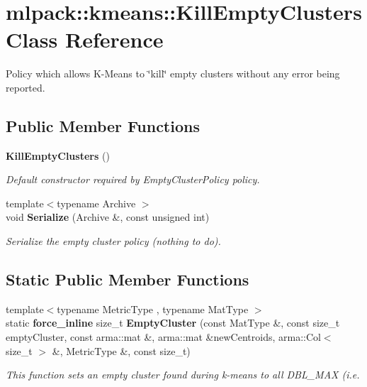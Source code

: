 \section{mlpack\+:\+:kmeans\+:\+:Kill\+Empty\+Clusters Class Reference}
\label{classmlpack_1_1kmeans_1_1KillEmptyClusters}


Policy which allows K-\/\+Means to \char`\"{}kill\char`\"{} empty clusters without any error being reported.  


\subsection*{Public Member Functions}
\begin{DoxyCompactItemize}
\item 
{\bf Kill\+Empty\+Clusters} ()
\begin{DoxyCompactList}\small\item\em Default constructor required by Empty\+Cluster\+Policy policy. \end{DoxyCompactList}\item 
{\footnotesize template$<$typename Archive $>$ }\\void {\bf Serialize} (Archive \&, const unsigned int)
\begin{DoxyCompactList}\small\item\em Serialize the empty cluster policy (nothing to do). \end{DoxyCompactList}\end{DoxyCompactItemize}
\subsection*{Static Public Member Functions}
\begin{DoxyCompactItemize}
\item 
{\footnotesize template$<$typename Metric\+Type , typename Mat\+Type $>$ }\\static {\bf force\+\_\+inline} size\+\_\+t {\bf Empty\+Cluster} (const Mat\+Type \&, const size\+\_\+t empty\+Cluster, const arma\+::mat \&, arma\+::mat \&new\+Centroids, arma\+::\+Col$<$ size\+\_\+t $>$ \&, Metric\+Type \&, const size\+\_\+t)
\begin{DoxyCompactList}\small\item\em This function sets an empty cluster found during k-\/means to all D\+B\+L\+\_\+\+M\+AX (i.\+e. \end{DoxyCompactList}\end{DoxyCompactItemize}


